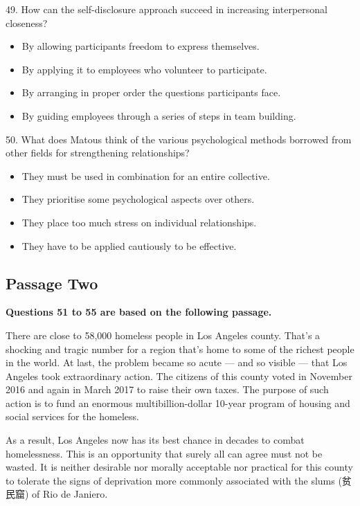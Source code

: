\documentclass[UTF8,11pt]{ctexart}
\begin{document}
49. How can the self-disclosure approach succeed in increasing interpersonal closeness?


\begin{itemize}[leftmargin=2em,itemsep=.2em,topsep=.4em]\item[A.] By allowing participants freedom to express themselves.
\item[B.] By applying it to employees who volunteer to participate.
\item[C.] By arranging in proper order the questions participants face.
\item[D.] By guiding employees through a series of steps in team building.
\end{itemize}

50. What does Matous think of the various psychological methods borrowed from other fields for strengthening relationships?


\begin{itemize}[leftmargin=2em,itemsep=.2em,topsep=.4em]\item[A.] They must be used in combination for an entire collective.
\item[B.] They prioritise some psychological aspects over others.
\item[C.] They place too much stress on individual relationships.
\item[D.] They have to be applied cautiously to be effective.
\end{itemize}

\subsection*{\textbf{Passage Two}}


\textbf{Questions 51 to 55 are based on the following passage.}


There are close to 58,000 homeless people in Los Angeles county. That’s a shocking and tragic number for a region that’s home to some of the richest people in the world. At last, the problem became so acute — and so visible — that Los Angeles took extraordinary action. The citizens of this county voted in November 2016 and again in March 2017 to raise their own taxes. The purpose of such action is to fund an enormous multibillion-dollar 10-year program of housing and social services for the homeless.


As a result, Los Angeles now has its best chance in decades to combat homelessness. This is an opportunity that surely all can agree must not be wasted. It is neither desirable nor morally acceptable nor practical for this county to tolerate the signs of deprivation more commonly associated with the slums (贫民窟) of Rio de Janiero.
\end{document}
